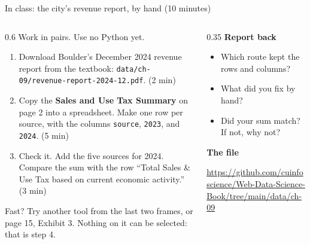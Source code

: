 \documentclass[9pt,aspectratio=169]{beamer}
\begin{document}
\begin{frame}{In class: the city's revenue report, by hand (10 minutes)}
    \begin{columns}[T]
        \begin{column}{0.6\textwidth}
            Work in pairs. Use no Python yet.
            \begin{enumerate}\small
                \item Download Boulder's December 2024 revenue report from the textbook: \texttt{data/ch-09/revenue-report-2024-12.pdf}. (2 min)
                \item Copy the \textbf{Sales and Use Tax Summary} on page 2 into a spreadsheet. Make one row per source, with the columns \texttt{source}, \texttt{2023}, and \texttt{2024}. (5 min)
                \item Check it. Add the five sources for 2024. Compare the sum with the row ``Total Sales \& Use Tax based on current economic activity.'' (3 min)
            \end{enumerate}
            \smallskip
            {\small Fast? Try another tool from the last two frames, or page 15, Exhibit 3. Nothing on it can be selected: that is step 4.}
        \end{column}
        \begin{column}{0.35\textwidth}
            \textbf{Report back}\\[2pt]
            \begin{itemize}\small
                \item Which route kept the rows and columns?
                \item What did you fix by hand?
                \item Did your sum match? If not, why not?
            \end{itemize}
            \medskip
            \textbf{The file}\\[2pt]
            {\scriptsize \url{https://github.com/cuinfoscience/Web-Data-Science-Book/tree/main/data/ch-09}\par}
        \end{column}
    \end{columns}
\end{frame}
\end{document}
